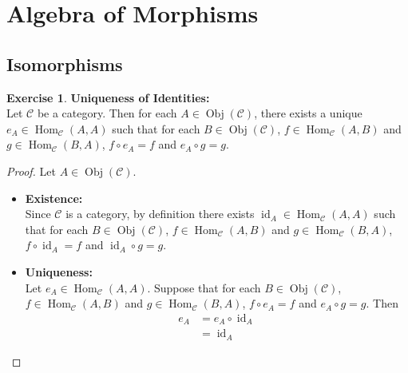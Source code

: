 \documentclass{book}
\theoremstyle{definition}
\newtheorem{ex}[definition]{Exercise}
\newcommand{\MC}{\mathcal{C}}
\newcommand{\lex}[1]{\label{ex:#1}}
\DeclareMathOperator{\id}{id}
\DeclareMathOperator{\Obj}{Obj}
\DeclareMathOperator{\Hom}{Hom}
\DeclareMathOperator*{\0}{\mbf{0}}
\DeclareMathOperator*{\1}{\mbf{1}}
\newcommand{\tbf}[1]{\textbf{#1}}
\begin{document}
	
	
	
	
	
	
	
	
	
	
	
	
	
	
	
	
	
	
	
	
	
	
	
	
	
	
	
	
	
	
	
	
	
	
	
	
	
	
	
	
	
	
	
	
	
	
	
	
	
	
	\newpage
	\section{Algebra of Morphisms}
	
	\subsection{Isomorphisms}
	
	\begin{ex} \lex{15001} \textbf{Uniqueness of Identities:} \\
		Let $\MC$ be a category. Then for each $A \in \Obj(\MC)$, there exists a unique $e_A \in \Hom_{\MC}(A, A)$ such that for each $B \in \Obj(\MC)$, $f \in \Hom_{\MC}(A, B)$ and $g \in \Hom_{\MC}(B, A)$, $f \circ e_A = f$ and $e_{A} \circ g = g$.
	\end{ex}
	
	\begin{proof}
		Let $A \in \Obj(\MC)$. 
		\begin{itemize}
			\item \tbf{Existence:} \\
			Since $\MC$ is a category, by definition there exists $\id_A \in \Hom_{\MC}(A, A)$ such that for each $B \in \Obj(\MC)$, $f \in \Hom_{\MC}(A, B)$ and $g \in \Hom_{\MC}(B, A)$, $f \circ \id_A = f$ and $\id_{A} \circ g = g$. 
			\item \tbf{Uniqueness: } \\
			Let $e_A \in \Hom_{\MC}(A, A)$. Suppose that for each $B \in \Obj(\MC)$, $f \in \Hom_{\MC}(A, B)$ and $g \in \Hom_{\MC}(B, A)$, $f \circ e_A = f$ and $e_{A} \circ g = g$. Then 
			\begin{align*}
				e_A
				& = e_A \circ \id_A \\
				& = \id_A 
			\end{align*}
		\end{itemize}
	\end{proof}
	
\end{document}
